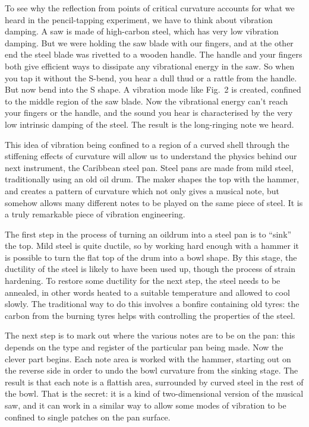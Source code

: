   To see why the reflection from points of critical curvature accounts for what 
  we heard in the pencil-tapping experiment, we have to think about vibration 
  damping. A saw is made of high-carbon steel, which has very low vibration 
  damping. But we were holding the saw blade with our fingers, and at the other 
  end the steel blade was rivetted to a wooden handle. The handle and your 
  fingers both give efficient ways to dissipate any vibrational energy in the 
  saw. So when you tap it without the S-bend, you hear a dull thud or a rattle 
  from the handle. But now bend into the S shape. A vibration mode like Fig.\ 2 
  is created, confined to the middle region of the saw blade. Now the 
  vibrational energy can't reach your fingers or the handle, and the sound you 
  hear is characterised by the very low intrinsic damping of the steel. The 
  result is the long-ringing note we heard. 

  This idea of vibration being confined to a region of a curved shell through 
  the stiffening effects of curvature will allow us to understand the physics 
  behind our next instrument, the Caribbean steel pan. Steel pans are made from 
  mild steel, traditionally using an old oil drum. The maker shapes the top 
  with the hammer, and creates a pattern of curvature which not only gives a 
  musical note, but somehow allows many different notes to be played on the 
  same piece of steel. It is a truly remarkable piece of vibration engineering. 

  The first step in the process of turning an oildrum into a steel pan is to 
  ``sink'' the top. Mild steel is quite ductile, so by working hard enough with 
  a hammer it is possible to turn the flat top of the drum into a bowl shape. 
  By this stage, the ductility of the steel is likely to have been used up, 
  though the process of strain hardening. To restore some ductility for the 
  next step, the steel needs to be annealed, in other words heated to a 
  suitable temperature and allowed to cool slowly. The traditional way to do 
  this involves a bonfire containing old tyres: the carbon from the burning 
  tyres helps with controlling the properties of the steel. 


  The next step is to mark out where the various notes are to be on the pan: 
  this depends on the type and register of the particular pan being made. Now 
  the clever part begins. Each note area is worked with the hammer, starting 
  out on the reverse side in order to undo the bowl curvature from the sinking 
  stage. The result is that each note is a flattish area, surrounded by curved 
  steel in the rest of the bowl. That is the secret: it is a kind of 
  two-dimensional version of the musical saw, and it can work in a similar way 
  to allow some modes of vibration to be confined to single patches on the pan 
  surface. 

